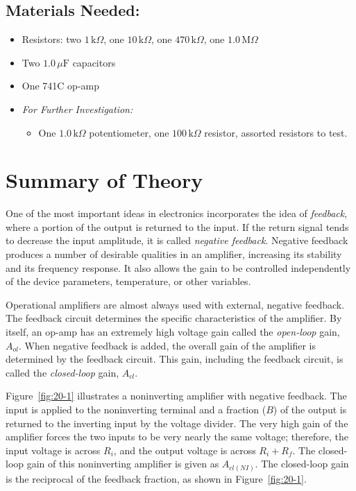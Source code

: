 \documentclass[11pt]{article}
\begin{document}
\subsection*{Materials Needed:}
\begin{itemize}
    \item Resistors: two $1\,\text{k}\Omega$, one $10\,\text{k}\Omega$, one $470\,\text{k}\Omega$, one $1.0\,\text{M}\Omega$
    \item Two $1.0\,\mu\text{F}$ capacitors
    \item One 741C op-amp
    \item \textit{For Further Investigation:}
    \begin{itemize}
        \item One $1.0\,\text{k}\Omega$ potentiometer, one $100\,\text{k}\Omega$ resistor, assorted resistors to test.
    \end{itemize}
\end{itemize}

\section*{Summary of Theory}

One of the most important ideas in electronics incorporates the idea of \textit{feedback}, where a portion of the output is returned to the input. If the return signal tends to decrease the input amplitude, it is called \textit{negative feedback}. Negative feedback produces a number of desirable qualities in an amplifier, increasing its stability and its frequency response. It also allows the gain to be controlled independently of the device parameters, temperature, or other variables.

Operational amplifiers are almost always used with external, negative feedback. The feedback circuit determines the specific characteristics of the amplifier. By itself, an op-amp has an extremely high voltage gain called the \textit{open-loop} gain, $A_{ol}$. When negative feedback is added, the overall gain of the amplifier is determined by the feedback circuit. This gain, including the feedback circuit, is called the \textit{closed-loop} gain, $A_{cl}$.

Figure~\ref{fig:20-1} illustrates a noninverting amplifier with negative feedback. The input is applied to the noninverting terminal and a fraction ($B$) of the output is returned to the inverting input by the voltage divider. The very high gain of the amplifier forces the two inputs to be very nearly the same voltage; therefore, the input voltage is across $R_i$, and the output voltage is across $R_i + R_f$. The closed-loop gain of this noninverting amplifier is given as $A_{cl(NI)}$. The closed-loop gain is the reciprocal of the feedback fraction, as shown in Figure~\ref{fig:20-1}.
\end{document}
